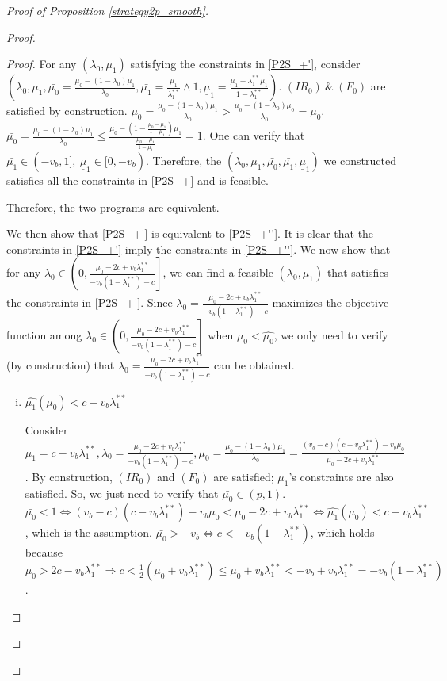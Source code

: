 \documentclass[11pt]{extarticle}
\newcommand{\lra}{\Leftrightarrow}
\newcommand{\ra}{\Rightarrow}
\newcommand{\m}{\wedge}
\begin{document}
\begin{proof}[Proof of Proposition \ref{strategy2p_smooth}]
\begin{enumerate}
\begin{proof}
\begin{proof}
				For any $(\lambda_0,\mu_1)$ satisfying the constraints in \eqref{P2S_+'}, consider $(\lambda_0,\mu_1,\bar{\mu_0}=\frac{\mu_0-(1-\lambda_0)\mu_1}{\lambda_0},\bar{\mu_1}=\frac{\mu_1}{\lambda_1^{**}}\m 1, \underline{\mu}_1=\frac{\mu_1-\lambda_1^{**}\bar{\mu_1}}{1-\lambda_1^{**}})$. $(IR_0)~\&~(F_0)$ are satisfied by construction. $\bar{\mu_0}=\frac{\mu_0-(1-\lambda_0)\mu_1}{\lambda_0} > \frac{\mu_0-(1-\lambda_0)\mu_0}{\lambda_0} = \mu_0$. $\bar{\mu_0}=\frac{\mu_0-(1-\lambda_0)\mu_1}{\lambda_0} \leq \frac{\mu_0-(1-\frac{\mu_0-\mu_1}{1-\mu_1})\mu_1}{\frac{\mu_0-\mu_1}{1-\mu_1}} = 1$. One can verify that $\bar{\mu_1} \in (-v_b,1],~\underline{\mu}_1\in [0,-v_b)$. Therefore, the $(\lambda_0,\mu_1,\bar{\mu_0},\bar{\mu_1}, \underline{\mu}_1)$ we constructed satisfies all the constraints in \eqref{P2S_+} and is feasible.
				
				Therefore, the two programs are equivalent.
				
				We then show that \eqref{P2S_+'} is equivalent to \eqref{P2S_+''}. It is clear that the constraints in \eqref{P2S_+'} imply the constraints in \eqref{P2S_+''}. We now show that for any $\lambda_0 \in \left(0, \frac{\mu_0-2c +v_b \lambda_1^{**}}{-v_b(1-\lambda_1^{**})-c}\right]$, we can find a feasible $(\lambda_0,\mu_1)$ that satisfies the constraints in \eqref{P2S_+'}. Since $\lambda_0 = \frac{\mu_0-2c +v_b \lambda_1^{**}}{-v_b(1-\lambda_1^{**})-c}$ maximizes the objective function among $\lambda_0 \in \left(0, \frac{\mu_0-2c +v_b \lambda_1^{**}}{-v_b(1-\lambda_1^{**})-c}\right]$ when $\mu_0 < \widehat{\mu_0}$, we only need to verify (by construction) that $\lambda_0 = \frac{\mu_0-2c +v_b \lambda_1^{**}}{-v_b(1-\lambda_1^{**})-c}$ can be obtained.
				\begin{enumerate}[i)]
					\item $\widehat{\mu_1}(\mu_0) < c - v_b\lambda_1^{**}$
					
					Consider $\mu_1 = c - v_b\lambda_1^{**}, \lambda_0 = \frac{\mu_0-2c +v_b \lambda_1^{**}}{-v_b(1-\lambda_1^{**})-c}, \bar{\mu_0} = \frac{\mu_0 - (1-\lambda_0)\mu_1}{\lambda_0} = 	\frac{(v_b-c)(c - v_b\lambda_1^{**})-v_b\mu_0}{\mu_0-2c+v_b \lambda_1^{**}}$. By construction, $(IR_0)$ and $(F_0)$ are satisfied; $\mu_1$'s constraints are also satisfied. So, we just need to verify that $\bar{\mu_0} \in (p,1)$. $\bar{\mu_0} < 1 \lra (v_b-c)(c - v_b\lambda_1^{**})-v_b\mu_0 < \mu_0-2c+v_b \lambda_1^{**} \lra \widehat{\mu_1}(\mu_0) < c - v_b\lambda_1^{**}$, which is the assumption.				 $\bar{\mu_0} > -v_b \lra c < -v_b(1-\lambda_1^{**})$, which holds because $\mu_0 > 2c-v_b \lambda_1^{**} \ra c < \frac{1}{2} (\mu_0 + v_b \lambda_1^{**}) \leq \mu_0 + v_b \lambda_1^{**} < -v_b + v_b \lambda_1^{**} = -v_b(1-\lambda_1^{**})$.
					

\end{enumerate}
\end{proof}
\end{proof}
\end{enumerate}
\end{proof}
\end{document}
